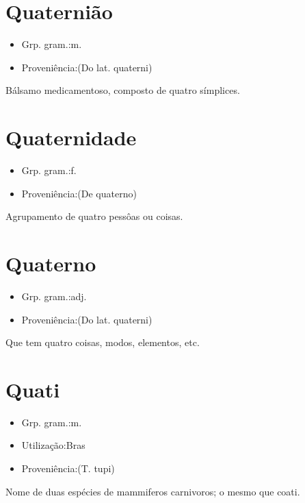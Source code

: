 \section{Quaternião}
\begin{itemize}
\item {Grp. gram.:m.}
\end{itemize}
\begin{itemize}
\item {Proveniência:(Do lat. \textunderscore quaterni\textunderscore )}
\end{itemize}
Bálsamo medicamentoso, composto de quatro símplices.
\section{Quaternidade}
\begin{itemize}
\item {Grp. gram.:f.}
\end{itemize}
\begin{itemize}
\item {Proveniência:(De \textunderscore quaterno\textunderscore )}
\end{itemize}
Agrupamento de quatro pessôas ou coisas.
\section{Quaterno}
\begin{itemize}
\item {Grp. gram.:adj.}
\end{itemize}
\begin{itemize}
\item {Proveniência:(Do lat. \textunderscore quaterni\textunderscore )}
\end{itemize}
Que tem quatro coisas, modos, elementos, etc.
\section{Quati}
\begin{itemize}
\item {Grp. gram.:m.}
\end{itemize}
\begin{itemize}
\item {Utilização:Bras}
\end{itemize}
\begin{itemize}
\item {Proveniência:(T. tupi)}
\end{itemize}
Nome de duas espécies de mammiferos carnivoros; o mesmo que \textunderscore coati\textunderscore .
